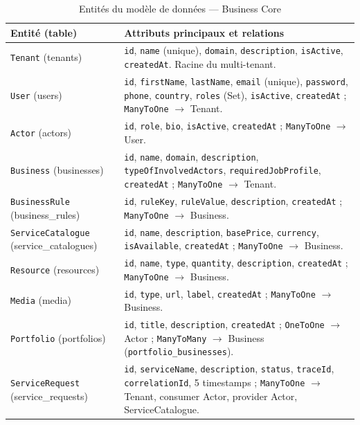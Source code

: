 \begin{table}[H]
\centering
\caption{Entités du modèle de données --- Business Core}
\label{tab:entites}
\renewcommand{\arraystretch}{1.25}\scriptsize
\begin{tabularx}{\linewidth}{L{2.5cm} X}
\toprule
\textbf{Entité (table)} & \textbf{Attributs principaux et relations} \\
\midrule
\texttt{Tenant} (tenants) & \texttt{id}, \texttt{name} (unique), \texttt{domain}, \texttt{description}, \texttt{isActive}, \texttt{createdAt}. Racine du multi-tenant. \\
\texttt{User} (users) & \texttt{id}, \texttt{firstName}, \texttt{lastName}, \texttt{email} (unique), \texttt{password}, \texttt{phone}, \texttt{country}, \texttt{roles} (Set), \texttt{isActive}, \texttt{createdAt} ; \texttt{ManyToOne} $\to$ Tenant. \\
\texttt{Actor} (actors) & \texttt{id}, \texttt{role}, \texttt{bio}, \texttt{isActive}, \texttt{createdAt} ; \texttt{ManyToOne} $\to$ User. \\
\texttt{Business} (businesses) & \texttt{id}, \texttt{name}, \texttt{domain}, \texttt{description}, \texttt{typeOfInvolvedActors}, \texttt{requiredJobProfile}, \texttt{createdAt} ; \texttt{ManyToOne} $\to$ Tenant. \\
\texttt{BusinessRule} (business\_rules) & \texttt{id}, \texttt{ruleKey}, \texttt{ruleValue}, \texttt{description}, \texttt{createdAt} ; \texttt{ManyToOne} $\to$ Business. \\
\texttt{ServiceCatalogue} (service\_catalogues) & \texttt{id}, \texttt{name}, \texttt{description}, \texttt{basePrice}, \texttt{currency}, \texttt{isAvailable}, \texttt{createdAt} ; \texttt{ManyToOne} $\to$ Business. \\
\texttt{Resource} (resources) & \texttt{id}, \texttt{name}, \texttt{type}, \texttt{quantity}, \texttt{description}, \texttt{createdAt} ; \texttt{ManyToOne} $\to$ Business. \\
\texttt{Media} (media) & \texttt{id}, \texttt{type}, \texttt{url}, \texttt{label}, \texttt{createdAt} ; \texttt{ManyToOne} $\to$ Business. \\
\texttt{Portfolio} (portfolios) & \texttt{id}, \texttt{title}, \texttt{description}, \texttt{createdAt} ; \texttt{OneToOne} $\to$ Actor ; \texttt{ManyToMany} $\to$ Business (\texttt{portfolio\_businesses}). \\
\texttt{ServiceRequest} (service\_requests) & \texttt{id}, \texttt{serviceName}, \texttt{description}, \texttt{status}, \texttt{traceId}, \texttt{correlationId}, 5 timestamps ; \texttt{ManyToOne} $\to$ Tenant, consumer Actor, provider Actor, ServiceCatalogue. \\

\end{tabularx}
\end{table}
